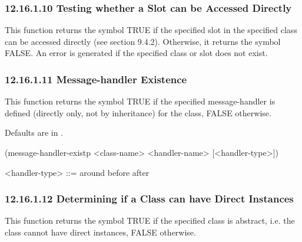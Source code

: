 \documentclass[letterpaper,10pt,english]{sphinxmanual}
\begin{document}
\subsubsection{12.16.1.10 Testing whether a Slot can be Accessed Directly}
\label{\detokenize{actions:testing-whether-a-slot-can-be-accessed-directly}}
This function returns the symbol TRUE if the specified slot in the
specified class can be accessed directly (see section 9.4.2). Otherwise,
it returns the symbol FALSE. An error is generated if the specified
class or slot does not exist.


\begin{sphinxVerbatim}[commandchars=\\\{\}]
  
\end{sphinxVerbatim}


\subsubsection{12.16.1.11 Message-handler Existence}
\label{\detokenize{actions:message-handler-existence}}
This function returns the symbol TRUE if the specified message-handler
is defined (directly only, not by inheritance) for the class, FALSE
otherwise.


Defaults are in .

(message-handler-existp \textless{}class-name\textgreater{} \textless{}handler-name\textgreater{} {[}\textless{}handler-type\textgreater{}{]})

\textless{}handler-type\textgreater{} ::= around \textbar{} before \textbar{}  \textbar{} after


\subsubsection{12.16.1.12 Determining if a Class can have Direct Instances}
\label{\detokenize{actions:determining-if-a-class-can-have-direct-instances}}
This function returns the symbol TRUE if the specified class is
abstract, i.e. the class cannot have direct instances, FALSE otherwise.
\end{document}
